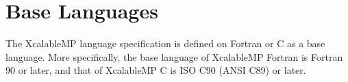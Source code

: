 \section{Base Languages}

The XcalableMP language specification is defined on Fortran or C as a
base language. More specifically, the base language of XcalableMP
Fortran is Fortran 90 or later, and that of XcalableMP C is ISO C90
(ANSI C89) or later.

%
%
%
%
%
%
